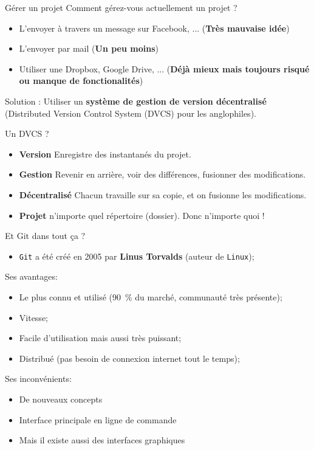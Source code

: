 \documentclass{beamer}
\begin{document}
\begin{frame}{Gérer un projet}
Comment gérez-vous actuellement un projet ?

\begin{itemize}
    \item L'envoyer à travers un message sur Facebook, ... (\textbf{Très mauvaise idée})
    \item L'envoyer par mail (\textbf{Un peu moins})
    \item Utiliser une Dropbox, Google Drive, ... (\textbf{Déjà mieux mais toujours risqué ou manque de fonctionalités})
\end{itemize}

Solution : Utiliser un \textbf{système de gestion de version décentralisé}
(Distributed Version Control System (DVCS) pour les anglophiles).
\end{frame}

\begin{frame}{Un DVCS ?}
    \begin{itemize}
        \item \textbf{Version} Enregistre des \og{}instantanés\fg{} du projet.
        \item \textbf{Gestion} Revenir en arrière, voir des différences,
            fusionner des modifications.
        \item \textbf{Décentralisé} Chacun travaille sur sa copie, et on fusionne les modifications.
        \item \textbf{Projet} n'importe quel répertoire (\og dossier\fg). Donc n'importe quoi !
    \end{itemize}
\end{frame}

\begin{frame}{Et Git dans tout ça ?}
\begin{itemize}
    \item \texttt{Git} a été créé en 2005 par \textbf{Linus Torvalds} (auteur de \texttt{Linux});
\end{itemize}
Ses avantages:
\begin{itemize}
    \item Le plus connu et utilisé (90~\% du marché, communauté très présente);
    \item Vitesse;
    \item Facile d'utilisation mais aussi très puissant;
    \item Distribué (pas besoin de connexion internet tout le temps);
\end{itemize}

Ses inconvénients:
\begin{itemize}
    \item De nouveaux concepts
    \item Interface principale en ligne de commande
    \item Mais il existe aussi des interfaces graphiques
\end{itemize}
\end{frame}
\end{document}
